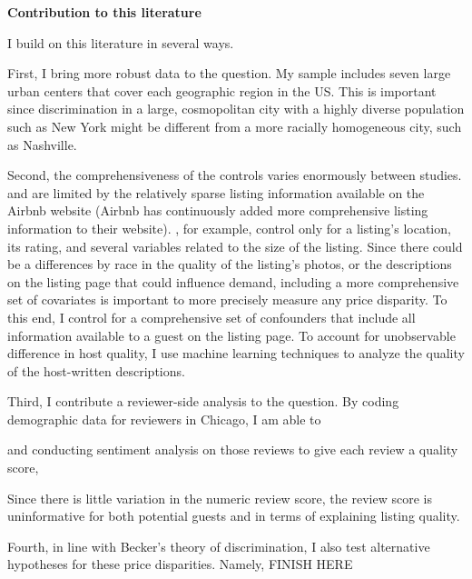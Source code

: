 \vspace{5mm}
\textbf{Contribution to this literature}

I build on this literature in several ways. 

First, I bring more robust data to the question. My sample includes seven large urban centers that cover each geographic region in the US. This is important since discrimination in a large, cosmopolitan city with a highly diverse population such as New York might be different from a more racially homogeneous city, such as Nashville. 

Second, the comprehensiveness of the controls varies enormously between studies. \cite{wang} and \cite{edelman} are limited by the relatively sparse listing information available on the Airbnb website (Airbnb has continuously added more comprehensive listing information to their website). \cite{edelman}, for example, control only for a listing's location, its rating, and several variables related to the size of the listing. Since there could be a differences by race in the quality of the listing’s photos, or the descriptions on the listing page that could influence demand, including a more comprehensive set of covariates is important to more precisely measure any price disparity. To this end, I control for a comprehensive set of confounders that include all information available to a guest on the listing page. To account for unobservable difference in host quality, I use machine learning techniques to analyze the quality of the host-written descriptions.

Third, I contribute a reviewer-side analysis to the question. By coding demographic data for reviewers in Chicago, I am able to 

and conducting sentiment analysis on those reviews to give each review a quality score,

Since there is little variation in the numeric review score, the review score is uninformative for both potential guests and in terms of explaining listing quality. 

Fourth, in line with Becker’s theory of discrimination, I also test alternative hypotheses for these price disparities. Namely, FINISH HERE












